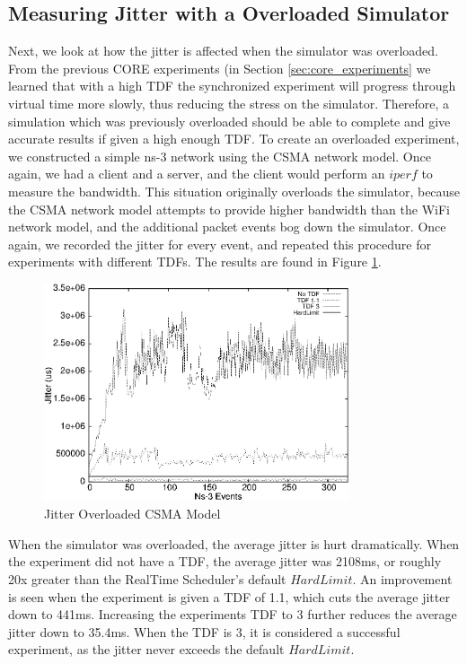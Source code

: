 \subsection{Measuring Jitter with a Overloaded Simulator}
Next, we look at how the jitter is affected when the simulator was overloaded. From the previous CORE experiments (in Section \ref{sec:core_experiments} we learned that with a high TDF the synchronized experiment will progress through virtual time more slowly, thus reducing the stress on the simulator.  Therefore, a simulation which was previously overloaded should be able to complete and give accurate results if given a high enough TDF. To create an overloaded experiment, we constructed a simple ns-3 network using the CSMA network model. Once again, we had a client and a server, and the  client would perform an $iperf$ to measure the bandwidth. This situation originally overloads the simulator, because the CSMA network model attempts to provide higher bandwidth than the WiFi network model, and the additional packet events bog down the simulator. Once again, we recorded the jitter for every event, and repeated this procedure for experiments with different TDFs. The results are found in Figure \ref{fig:overloaded}.
\begin{figure} \centering  
      \includegraphics[width=0.8\textwidth]{images/jitter_overloaded.eps} 
    \caption{Jitter Overloaded CSMA Model} 
    \label{fig:overloaded} 
  \end{figure}
  When the simulator was overloaded, the average jitter is hurt dramatically. When the experiment did not have a TDF, the average jitter was 2108ms, or roughly 20x greater than the RealTime Scheduler's default $HardLimit$. An improvement is seen when the experiment is given a TDF of 1.1, which cuts the average jitter down to 441ms. Increasing the experiments TDF to 3 further reduces the average jitter down to 35.4ms. When the TDF is 3, it is considered a successful experiment, as the jitter never exceeds the default $HardLimit$. 
